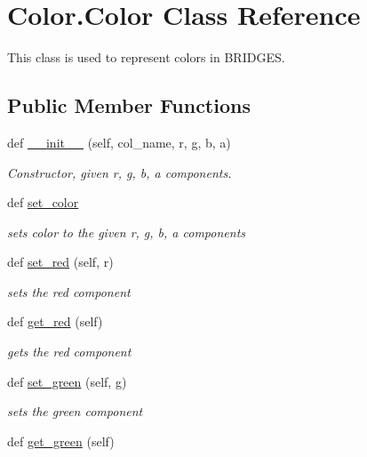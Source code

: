 \hypertarget{class_color_1_1_color}{}\section{Color.\+Color Class Reference}
\label{class_color_1_1_color}


This class is used to represent colors in B\+R\+I\+D\+G\+E\+S.  


\subsection*{Public Member Functions}
\begin{DoxyCompactItemize}
\item 
def \hyperlink{class_color_1_1_color_a3dd362b85ad7a7ad2d45cc511c5f5728}{\+\_\+\+\_\+init\+\_\+\+\_\+} (self, col\+\_\+name, r, g, b, a)
\begin{DoxyCompactList}\small\item\em Constructor, given r, g, b, a components. \end{DoxyCompactList}\item 
def \hyperlink{class_color_1_1_color_a0b720155e1c4ed0a9a6941cee2233620}{set\+\_\+color}
\begin{DoxyCompactList}\small\item\em sets color to the given r, g, b, a components \end{DoxyCompactList}\item 
def \hyperlink{class_color_1_1_color_acc600b0fb3d5d4809ad8e651702b852a}{set\+\_\+red} (self, r)
\begin{DoxyCompactList}\small\item\em sets the red component \end{DoxyCompactList}\item 
def \hyperlink{class_color_1_1_color_a786b2c6c71b6ccb462a32b56cc6e852f}{get\+\_\+red} (self)
\begin{DoxyCompactList}\small\item\em gets the red component \end{DoxyCompactList}\item 
def \hyperlink{class_color_1_1_color_a3837131f2227e68793ce03ceefbc51f6}{set\+\_\+green} (self, g)
\begin{DoxyCompactList}\small\item\em sets the green component \end{DoxyCompactList}\item 
def \hyperlink{class_color_1_1_color_a8cdcff171cc9af3acce32fe234716a2a}{get\+\_\+green} (self)

\end{DoxyCompactItemize}
